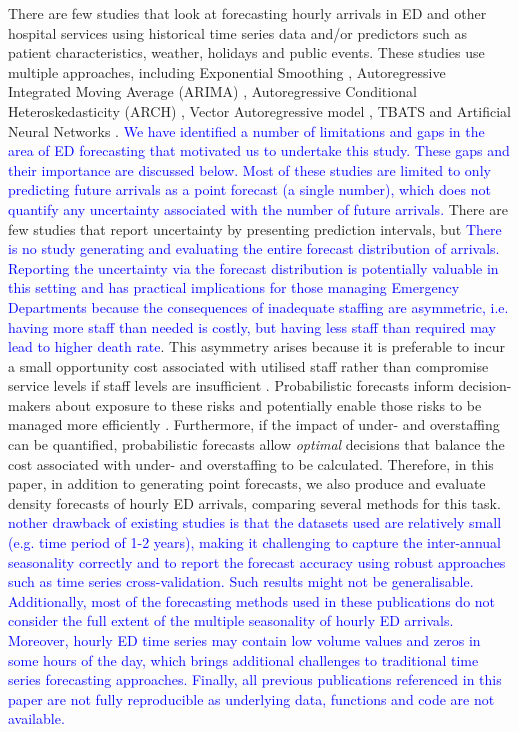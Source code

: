 \documentclass[]{elsarticle} %
\begin{document}
There are few studies that look at forecasting hourly arrivals in ED and
other hospital services using historical time series data and/or
predictors such as patient characteristics, weather, holidays and public
events. These studies use multiple approaches, including Exponential
Smoothing \citep{SvetunkovAdam}, Autoregressive Integrated Moving Average
(ARIMA) \citep{hyndman2021forecasting}, Autoregressive Conditional
Heteroskedasticity (ARCH) \citep{bollerslev1994arch}, Vector Autoregressive
model \citep{lutkepohl2013vector}, TBATS \citep{de2011forecasting} and Artificial
Neural Networks \citep{hyndman2021forecasting}. \textcolor{blue}{We have identified a number of limitations and gaps in the area of ED forecasting that motivated us to undertake this study. These gaps and their importance are discussed below.} \textcolor{blue}{Most of these studies are limited to only predicting future arrivals as a point
forecast (a single number), which does not quantify any uncertainty associated with the number of future arrivals.} There are few studies that report uncertainty by presenting prediction intervals, but \textcolor{blue}{There is no study generating and evaluating the entire forecast distribution of arrivals. Reporting the uncertainty via the forecast distribution is potentially valuable in this setting and has practical implications for those managing Emergency Departments because the consequences of inadequate staffing are asymmetric, i.e. having more staff than needed is costly, but
having less staff than required may lead to higher death rate}. This asymmetry arises because it is preferable to incur a small opportunity cost associated with utilised staff rather than compromise service levels if staff levels are insufficient \citep{wright2006reexamining}. Probabilistic forecasts inform decision-makers about exposure to these risks and potentially enable those risks to be managed more efficiently \citep{ramos2013probabilistic, ROSTAMITABAR20221197}. Furthermore, if the impact of under- and overstaffing can be quantified,
probabilistic forecasts allow \emph{optimal} decisions that balance the cost associated with under- and overstaffing to be calculated. Therefore, in this paper, in addition to generating point forecasts, we also produce and evaluate density forecasts of hourly ED arrivals, comparing several methods for this task. \textcolor{blue}{nother drawback of existing studies is that the datasets used are relatively small (e.g. time period of 1-2 years), making it challenging to capture the inter-annual seasonality correctly and to report the forecast accuracy using robust approaches such as time series cross-validation. Such results might not be generalisable. Additionally, most of the forecasting methods used in these publications do not consider the full extent of the multiple seasonality of hourly ED arrivals. Moreover, hourly ED time series may contain low volume values and zeros in some hours of the day, which brings additional challenges to traditional time series forecasting approaches. Finally, all previous publications referenced in this paper are not fully reproducible as underlying data, functions and code are not available.}
\end{document}
